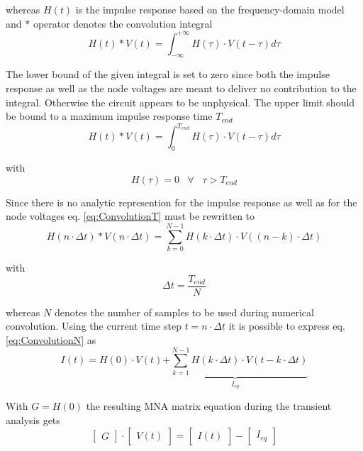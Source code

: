 whereas $H\left(t\right)$ is the impulse response based on the
frequency-domain model and $*$ operator denotes the convolution
integral
\begin{equation}
H\left(t\right)
*
V\left(t\right)
=
\int^{+\infty}_{-\infty} H\left(\tau\right)\cdot V\left(t-\tau\right) d\tau
\end{equation}

The lower bound of the given integral is set to zero since both the
impulse response as well as the node voltages are meant to deliver no
contribution to the integral.  Otherwise the circuit appears to be
unphysical.  The upper limit should be bound to a maximum impulse
response time $T_{end}$
\begin{equation}
\label{eq:ConvolutionT}
H\left(t\right)
*
V\left(t\right)
=
\int^{T_{end}}_{0} H\left(\tau\right)\cdot V\left(t-\tau\right) d\tau
\end{equation}

with
\begin{equation}
H\left(\tau\right) = 0 \;\;\; \forall \;\;\; \tau > T_{end}
\end{equation}

Since there is no analytic represention for the impulse response as
well as for the node voltages eq. \eqref{eq:ConvolutionT} must be
rewritten to
\begin{equation}
\label{eq:ConvolutionN}
H\left(n\cdot\Delta t\right)
*
V\left(n\cdot\Delta t\right)
=
\sum^{N-1}_{k=0} H\left(k\cdot\Delta t\right)\cdot V\left(\left(n-k\right)\cdot\Delta t\right)
\end{equation}

with
\begin{equation}
\Delta t = \dfrac{T_{end}}{N}
\end{equation}

whereas $N$ denotes the number of samples to be used during numerical
convolution.  Using the current time step $t = n\cdot\Delta t$ it is
possible to express eq. \eqref{eq:ConvolutionN} as
\begin{equation}
I\left(t\right) =
H\left(0\right)\cdot V\left(t\right) \underbrace{+
\sum^{N-1}_{k=1} H\left(k\cdot\Delta t\right)\cdot V\left(t -k\cdot\Delta t\right)}_{I_{eq}}
\end{equation}

With $G = H\left(0\right)$ the resulting MNA matrix equation during
the transient analysis gets
\begin{equation}
\begin{bmatrix}
G
\end{bmatrix}
\cdot
\begin{bmatrix}
V\left(t\right)
\end{bmatrix}
=
\begin{bmatrix}
I\left(t\right)
\end{bmatrix}
-
\begin{bmatrix}
I_{eq}
\end{bmatrix}
\end{equation}


